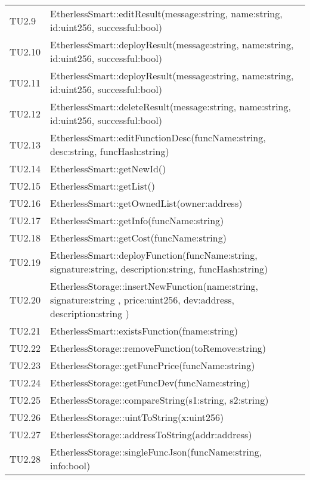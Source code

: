 \begin{longtable}{
		>{\centering}p{}
		>{\centering\arraybackslash}p{}}
	TU2.9  &  EtherlessSmart::editResult(message:string, name:string, id:uint256, successful:bool)  \tabularnewline
	
	TU2.10 &  EtherlessSmart::deployResult(message:string, name:string, id:uint256, successful:bool)  \tabularnewline
	
	TU2.11 &  EtherlessSmart::deployResult(message:string, name:string, id:uint256, successful:bool)  \tabularnewline
	
	TU2.12 &  EtherlessSmart::deleteResult(message:string, name:string, id:uint256, successful:bool)  \tabularnewline
	
	TU2.13 &  EtherlessSmart::editFunctionDesc(funcName:string, desc:string, funcHash:string)  \tabularnewline
	
	TU2.14 &  EtherlessSmart::getNewId()  \tabularnewline
	
	TU2.15 &  EtherlessSmart::getList()  \tabularnewline
	
	TU2.16 &  EtherlessSmart::getOwnedList(owner:address)  \tabularnewline
	
	TU2.17 &  EtherlessSmart::getInfo(funcName:string)  \tabularnewline
	
	TU2.18 &  EtherlessSmart::getCost(funcName:string)  \tabularnewline
	
	TU2.19 &  EtherlessSmart::deployFunction(funcName:string, signature:string, description:string, funcHash:string)  \tabularnewline
	
	TU2.20 &  EtherlessStorage::insertNewFunction(name:string, signature:string , price:uint256, dev:address, description:string )  \tabularnewline
	
	TU2.21 &  EtherlessSmart::existsFunction(fname:string)  \tabularnewline
	
	TU2.22 &  EtherlessStorage::removeFunction(toRemove:string)  \tabularnewline
	
	TU2.23 &  EtherlessStorage::getFuncPrice(funcName:string)  \tabularnewline
	
	TU2.24 &  EtherlessStorage::getFuncDev(funcName:string)  \tabularnewline
	
	TU2.25 &  EtherlessStorage::compareString(s1:string, s2:string)  \tabularnewline
	
	TU2.26 &  EtherlessStorage::uintToString(x:uint256)  \tabularnewline
	
	TU2.27 &  EtherlessStorage::addressToString(addr:address)  \tabularnewline
	
	TU2.28 &  EtherlessStorage::singleFuncJson(funcName:string, info:bool)  \tabularnewline
	

\end{longtable}
